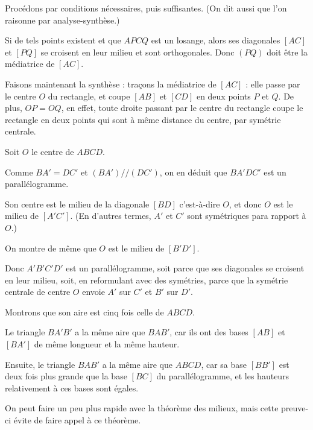 \begin{Soln}{27}
Procédons par conditions nécessaires, puis suffisantes. (On dit aussi que l'on raisonne par analyse-synthèse.)

Si de tels points existent et que $APCQ$ est un losange, alors ses diagonales $[AC]$ et $[PQ]$ se croisent en leur milieu et sont orthogonales. Donc $(PQ)$ doit être la médiatrice de $[AC]$.

Faisons maintenant la synthèse : traçons la médiatrice de $[AC]$ : elle passe par le centre $O$ du rectangle, et coupe $[AB]$ et $[CD]$ en deux points $P$ et $Q$. De plus, $OP=OQ$, en effet, toute droite passant par le centre du rectangle coupe le rectangle en deux points qui sont à même distance du centre, par symétrie centrale.
\end{Soln}
\begin{Soln}{28}
Soit $O$ le centre de $ABCD$.

Comme $BA'=DC'$ et $(BA')//(DC')$, on en déduit que $BA'DC'$ est un parallélogramme.


Son centre est le milieu de la diagonale $[BD]$ c'est-à-dire $O$, et donc $O$ est le milieu de $[A'C']$. (En d'autres termes, $A'$ et $C'$ sont symétriques para rapport à $O$.)


On montre de même que $O$ est le milieu de $[B'D']$.


Donc $A'B'C'D'$ est un parallélogramme, soit parce que ses diagonales se croisent en leur milieu, soit, en reformulant avec des symétries, parce que la symétrie centrale de centre $O$ envoie $A'$ sur $C'$ et $B'$ sur $D'$.


Montrons que son aire est cinq fois celle de $ABCD$.

Le triangle $BA'B'$ a la même aire que $BAB'$, car ils ont des bases $[AB]$ et $[BA']$ de même longueur et la même hauteur.


Ensuite, le triangle $BAB'$ a la même aire que $ABCD$, car sa base $[BB']$ est deux fois plus grande que la base $[BC]$ du parallélogramme, et les hauteurs relativement à ces bases sont égales.


On peut faire un peu plus rapide avec la théorème des milieux, mais cette preuve-ci évite de faire appel à ce théorème.
\end{Soln}

